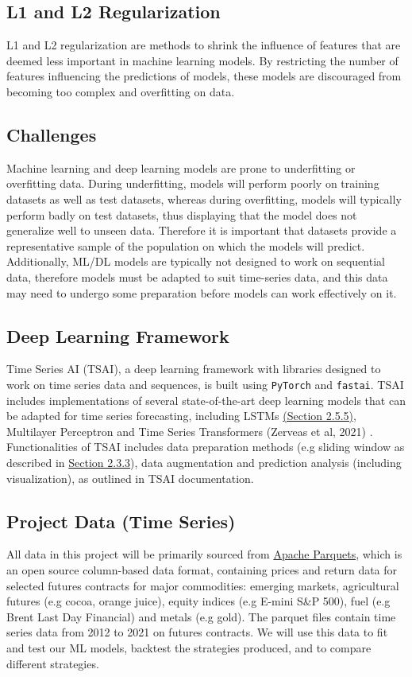 \subsection{L1 and L2 Regularization}
\label{l1l2}
L1 \cite{tibshirani1996regression} and L2 regularization \cite{hoerl1970ridge} are methods to shrink the influence of features that are deemed less important in machine learning models. By restricting the number of features influencing the predictions of models, these models are discouraged from becoming too complex and overfitting on data.

\subsection{Challenges}
\label{challenges}
Machine learning and deep learning models are prone to underfitting or overfitting data. During underfitting, models will perform poorly on training datasets as well as test datasets, whereas during overfitting, models will typically perform badly on test datasets, thus displaying that the model does not generalize well to unseen data. Therefore it is important that datasets provide a representative sample of the population on which the models will predict. Additionally, ML/DL models are typically not designed to work on sequential data, therefore models must be adapted to suit time-series data, and this data may need to undergo some preparation before models can work effectively on it.

\subsection{Deep Learning Framework}
Time Series AI (TSAI), a deep learning framework with libraries designed to work on time series data and sequences, is built using \texttt{PyTorch} and \texttt{fastai}. TSAI includes implementations of several state-of-the-art deep learning models that can be adapted for time series forecasting, including LSTMs \hyperref[lstms+transforms]{(Section 2.5.5)}, Multilayer Perceptron and Time Series Transformers (Zerveas et al, 2021) \cite{10.1145/3447548.3467401}. Functionalities of TSAI includes data preparation methods (e.g sliding window as described in \hyperref[wfo]{Section 2.3.3}), data augmentation and prediction analysis (including visualization), as outlined in TSAI documentation. \cite{tsai}
\subsection{Project Data (Time Series)}
All data in this project will be primarily sourced from \href{https://github.com/apache/parquet-format}{Apache Parquets}, which is an open source column-based data format,  containing prices and return data for selected futures contracts for major commodities: emerging markets, agricultural futures (e.g cocoa, orange juice), equity indices (e.g E-mini S\&P 500), fuel (e.g Brent Last Day Financial) and metals (e.g gold). The parquet files contain time series data from 2012 to 2021 on futures contracts. We will use this data to fit and test our ML models, backtest the strategies produced, and to compare different strategies. 

